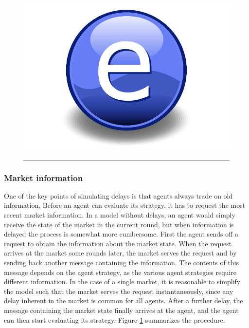 \begin{figure}[htbp]
	\centering
		\includegraphics{Figures/Electron.pdf}
		\rule{35em}{0.5pt}
	\caption{}
	\label{fig:information_exchange}
\end{figure}


\subsubsection{Market information}
One of the key points of simulating delays is that agents always trade on old information. Before an agent can evaluate its strategy, it has to request the most recent market information. In a model without delays, an agent would simply receive the state of the market in the current round, but when information is delayed the process is somewhat more cumbersome. First the agent sends off a request to obtain the information about the market state. When the request arrives at the market some rounds later, the market serves the request and by sending back another message containing the information. The contents of this message depends on the agent strategy, as the various agent strategies require different information. 
In the case of a single market, it is reasonable to simplify the model such that the market serves the request instantaneously, since any delay inherent in the market is common for all agents. 
After a further delay, the message containing the market state finally arrives at the agent, and the agent can then start evaluating its strategy. Figure \ref{fig:information_exchange} summarizes the procedure.

